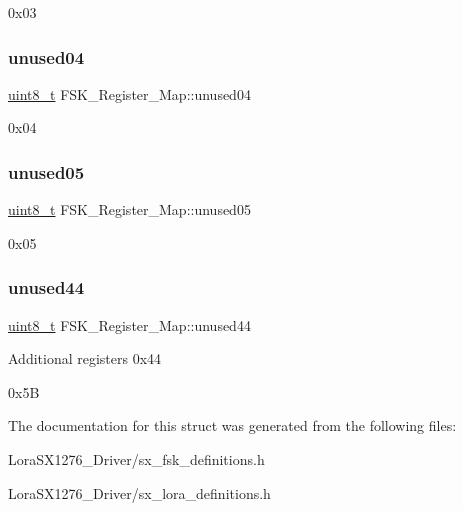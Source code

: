 0x03 \mbox{\label{structFSK__Register__Map_ae27a2e44c6d1716aa2772ccb7b4a1968}} 
\subsubsection{\texorpdfstring{unused04}{unused04}}
{\footnotesize\ttfamily \hyperlink{vl53l0x__types_8h_aba7bc1797add20fe3efdf37ced1182c5}{uint8\+\_\+t} F\+S\+K\+\_\+\+Register\+\_\+\+Map\+::unused04}

0x04 \mbox{\label{structFSK__Register__Map_a849022a1aa6af4524f2d10da17ea0171}} 
\subsubsection{\texorpdfstring{unused05}{unused05}}
{\footnotesize\ttfamily \hyperlink{vl53l0x__types_8h_aba7bc1797add20fe3efdf37ced1182c5}{uint8\+\_\+t} F\+S\+K\+\_\+\+Register\+\_\+\+Map\+::unused05}

0x05 \mbox{\label{structFSK__Register__Map_a20fbe4738c5d1c780ea316118594d9b6}} 
\subsubsection{\texorpdfstring{unused44}{unused44}}
{\footnotesize\ttfamily \hyperlink{vl53l0x__types_8h_aba7bc1797add20fe3efdf37ced1182c5}{uint8\+\_\+t} F\+S\+K\+\_\+\+Register\+\_\+\+Map\+::unused44}

Additional registers 0x44

0x5B 

The documentation for this struct was generated from the following files\+:\begin{DoxyCompactItemize}
\item 
Lora\+S\+X1276\+\_\+\+Driver/sx\+\_\+fsk\+\_\+definitions.\+h\item 
Lora\+S\+X1276\+\_\+\+Driver/sx\+\_\+lora\+\_\+definitions.\+h\end{DoxyCompactItemize}
